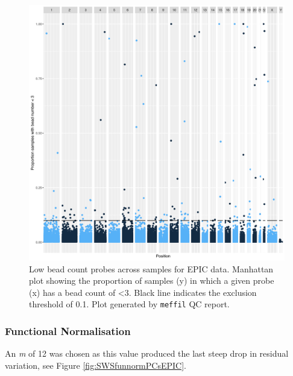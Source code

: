 \documentclass[
]{book}
\begin{document}
\begin{figure}

{\centering \includegraphics[width=0.8\linewidth]{figs/SWSqcEPICbeadNumAcross} 

}

\caption{Low bead count probes across samples for EPIC data. Manhattan plot showing the proportion of samples (y) in which a given probe (x) has a bead count of \textless3. Black line indicates the exclusion threshold of 0.1. Plot generated by \texttt{meffil} QC report.}\label{fig:SWSqcEPICbeadNumAcross}
\end{figure}



\hypertarget{functional-normalisation-3}{%
\subsubsection{Functional Normalisation}\label{functional-normalisation-3}}

An \emph{m} of 12 was chosen as this value produced the last steep drop in residual variation, see Figure \ref{fig:SWSfunnormPCsEPIC}.
\end{document}

